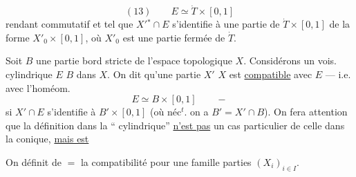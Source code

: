 \[
(13)\qquad E\simeq\dot T\times[0,1]
\]
rendant commutatif
et tel que $X'{}^*\cap E$ s'identifie à une partie
de $\dot T\times[0,1]$ de la forme $X'_0\times[0,1]$, où $X'_0$
est une partie fermée de $\dot T$.

Soit $B$ une partie bord stricte de l'espace
topologique $X$. Considérons un vois.
cylindrique $E$  $B$ dans $X$. On
dit qu'une partie  $X'$  $X$ est \uline{compatible}
avec $E$ --- i.e. avec l'homéom.
\[
E\simeq B\times[0,1]\qquad -
\]
si $X'\cap E$ s'identifie à $B'\times[0,1]$
(où néc$^t$. on a $B'=X'\cap B$).
On fera attention que la définition dans la
``
 cylindrique'' \uline{n'est pas} un cas
particulier de celle dans la 
conique, \uline{mais est}

On définit de $=$ la compatibilité pour
une famille   parties $(X_i)_{i\in I}$.
